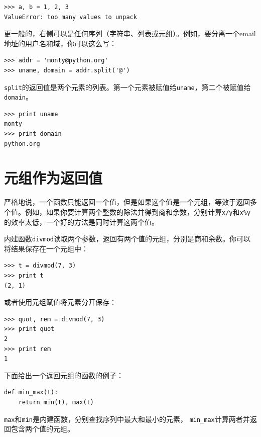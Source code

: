 
\beforeverb
\begin{verbatim}
>>> a, b = 1, 2, 3
ValueError: too many values to unpack
\end{verbatim}
\afterverb
%
更一般的，右侧可以是任何序列（字符串、列表或元组）。例如，要分离一个email地址的用户名和域，你可以这么写：


\beforeverb
\begin{verbatim}
>>> addr = 'monty@python.org'
>>> uname, domain = addr.split('@')
\end{verbatim}
\afterverb
%
{\tt split}的返回值是两个元素的列表。第一个元素被赋值给{\tt uname}，第二个被赋值给{\tt domain}。

\beforeverb
\begin{verbatim}
>>> print uname
monty
>>> print domain
python.org
\end{verbatim}
\afterverb
%

\section{元组作为返回值}


严格地说，一个函数只能返回一个值，但是如果这个值是一个元组，等效于返回多个值。例如，如果你要计算两个整数的除法并得到商和余数，分别计算{\tt x/y}和{\tt x\%y}的效率太低，一个好的方法是同时计算这两个值。


内建函数{\tt divmod}读取两个参数，返回有两个值的元组，分别是商和余数。你可以将结果保存在一个元组中：

\beforeverb
\begin{verbatim}
>>> t = divmod(7, 3)
>>> print t
(2, 1)
\end{verbatim}
\afterverb
%
或者使用元组赋值将元素分开保存：


\beforeverb
\begin{verbatim}
>>> quot, rem = divmod(7, 3)
>>> print quot
2
>>> print rem
1
\end{verbatim}
\afterverb
%
下面给出一个返回元组的函数的例子：

\beforeverb
\begin{verbatim}
def min_max(t):
    return min(t), max(t)
\end{verbatim}
\afterverb
%
{\tt max}和{\tt min}是内建函数，分别查找序列中最大和最小的元素， \verb"min_max"计算两者并返回包含两个值的元组。

